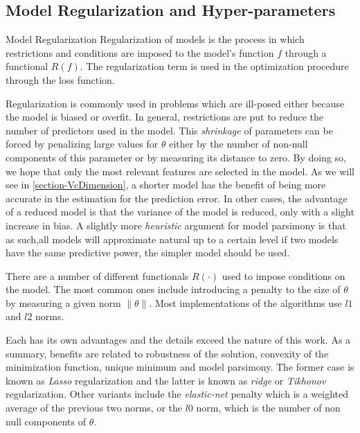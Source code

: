 \subsection{Model Regularization and Hyper-parameters} \label{subsection-hyperParametersRegularization}


\begin{definition}{Model Regularization}
Regularization of models is the process in which restrictions and conditions are imposed  to the model's function $f$ through a functional $ R(f)$. The regularization term is used in the optimization procedure through the loss function.
\end{definition}

Regularization is commonly used in problems which are ill-posed either because the model is biased or overfit. In general, restrictions are put to reduce the number of predictors used in the model. This \textit{shrinkage} of parameters can be forced by penalizing large values for $\theta$ either by the number of non-null components of this parameter or by measuring its distance to zero. By doing so, we hope that only the most relevant features are selected in the model. As we will see in \ref{section-VcDimension}, a shorter model has the benefit of being more accurate in the estimation for the prediction error. In other cases, the advantage of a reduced model is that the variance of the model is reduced, only with a slight increase in bias. A slightly more \textit{heuristic} argument for model parsimony is that as such,all models will approximate natural up to a certain level if two models have the same predictive power, the simpler model should be used.


There are a number of different functionals $R(\cdot)$ used to impose conditions on the model. The most common ones include introducing a penalty to the size of $\theta$ by measuring a given norm  $\| \theta \|$.  Most implementations of the algorithms use $l1$ and $l2$ norms.

Each has its own advantages and the details exceed the nature of this work. As a summary, benefits are related to robustness of the solution, convexity of the minimization function, unique minimum and model parsimony. The former case is known as \textit{ Lasso} regularization and the latter is known as \textit{ridge} or \textit{Tikhonov} regularization. Other variants include the \textit{elastic-net} penalty which is a weighted average of the previous two norms, or the $l0$ norm, which is the number of non null components of $\theta$.


